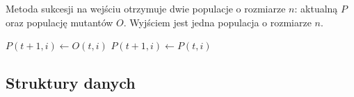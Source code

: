 \documentclass[12pt, a4paper]{article}
\begin{document}
Metoda sukcesji na wejściu otrzymuje dwie populacje o rozmiarze $n$: aktualną $P$ oraz populację mutantów $O$.
Wyjściem jest jedna populacja o rozmiarze $n$.

\begin{algorithm}[!htb]
\begin{algorithmic}[1]
      \State $P(t+1, i) \gets O(t, i)$
    \Else
      \State $P(t+1, i) \gets P(t, i)$
    \EndIf
  \EndFor
\EndFunction
\end{algorithmic}
\end{algorithm}

\subsection{Struktury danych}
\end{document}
